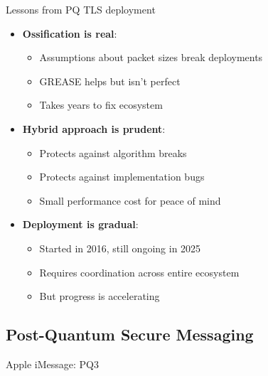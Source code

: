\documentclass[aspectratio=169, lualatex, handout]{beamer}
\begin{document}
\begin{frame}{Lessons from PQ TLS deployment}
	\begin{itemize}
		\item \textbf{Ossification is real}:
		      \begin{itemize}
			      \item Assumptions about packet sizes break deployments
			      \item GREASE helps but isn't perfect
			      \item Takes years to fix ecosystem
		      \end{itemize}
		\item \textbf{Hybrid approach is prudent}:
		      \begin{itemize}
			      \item Protects against algorithm breaks
			      \item Protects against implementation bugs
			      \item Small performance cost for peace of mind
		      \end{itemize}
		\item \textbf{Deployment is gradual}:
		      \begin{itemize}
			      \item Started in 2016, still ongoing in 2025
			      \item Requires coordination across entire ecosystem
			      \item But progress is accelerating
		      \end{itemize}
	\end{itemize}
\end{frame}


\subsection{Post-Quantum Secure Messaging}
\begin{frame}{Apple iMessage: PQ3}
\end{frame}
\end{document}
